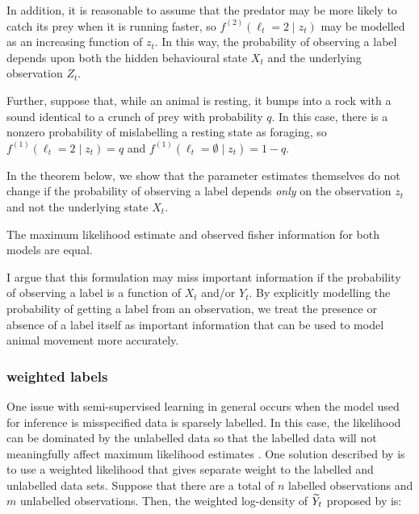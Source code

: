 In addition, it is reasonable to assume that the predator may be more likely to catch its prey when it is running faster, so $f^{(2)}(\ell_t = 2 \mid z_t)$ may be modelled as an increasing function of $z_t$. %
In this way, the probability of observing a label depends upon both the hidden behavioural state $X_t$ and the underlying observation $Z_t$.

Further, suppose that, while an animal is resting, it bumps into a rock with a sound identical to a crunch of prey with probability $q$. In this case, there is a nonzero probability of mislabelling a resting state as foraging, so $f^{(1)}(\ell_t = 2 \mid z_t) = q$ and $f^{(1)}(\ell_t = \emptyset \mid z_t) = 1-q$.

In the theorem below, we show that the parameter estimates themselves do not change if the probability of observing a label depends \textit{only} on the observation $z_t$ and not the underlying state $X_t$.

\begin{theorem}

    The maximum likelihood estimate and observed fisher information for both models are equal.

\end{theorem}

I argue that this formulation may miss important information if the probability of observing a label is a function of $X_t$ and/or $Y_t$. By explicitly modelling the probability of getting a label from an observation, we treat the presence or absence of a label itself as important information that can be used to model animal movement more accurately.

\subsubsection{weighted labels}

One issue with semi-supervised learning in general occurs when the model used for inference is misspecified data is sparsely labelled. In this case, the likelihood can be dominated by the unlabelled data so that the labelled data will not meaningfully affect maximum likelihood estimates \citep{Chapelle:2006,Ren:2020}. One solution described by \citet{Chapelle:2006} is to use a weighted likelihood that gives separate weight to the labelled and unlabelled data sets. Suppose that there are a total of $n$ labelled observations and $m$ unlabelled observations. Then, the weighted log-density of $\widetilde{Y}_t$ proposed by \citet{Chapelle:2006} is:

